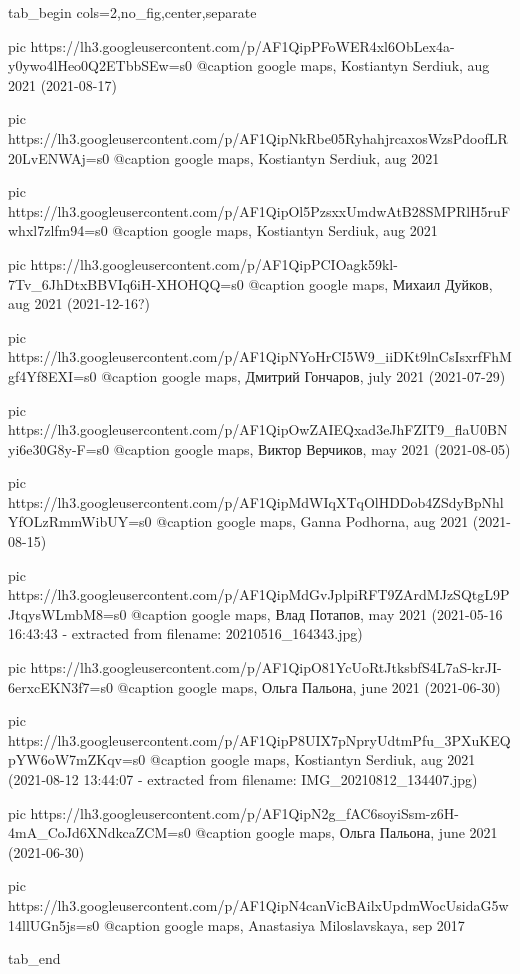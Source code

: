  
 
 
 
 

\ifcmt
  tab_begin cols=2,no_fig,center,separate

     pic https://lh3.googleusercontent.com/p/AF1QipPFoWER4xl6ObLex4a-y0ywo4lHeo0Q2ETbbSEw=s0
		 @caption google maps, Kostiantyn Serdiuk, aug 2021 (2021-08-17)

		 pic https://lh3.googleusercontent.com/p/AF1QipNkRbe05RyhahjrcaxosWzsPdoofLR20LvENWAj=s0
		 @caption google maps, Kostiantyn Serdiuk, aug 2021

		 pic https://lh3.googleusercontent.com/p/AF1QipOl5PzsxxUmdwAtB28SMPRlH5ruFwhxl7zlfm94=s0
		 @caption google maps, Kostiantyn Serdiuk, aug 2021

		 pic https://lh3.googleusercontent.com/p/AF1QipPCIOagk59kl-7Tv_6JhDtxBBVIq6iH-XHOHQQ=s0
		 @caption google maps, Михаил Дуйков, aug 2021 (2021-12-16?)

		 pic https://lh3.googleusercontent.com/p/AF1QipNYoHrCI5W9_iiDKt9lnCsIsxrfFhMgf4Yf8EXI=s0
		 @caption google maps, Дмитрий Гончаров, july 2021 (2021-07-29)

		 pic https://lh3.googleusercontent.com/p/AF1QipOwZAIEQxad3eJhFZIT9_flaU0BNyi6e30G8y-F=s0
		 @caption google maps, Виктор Верчиков, may 2021 (2021-08-05)

		 pic https://lh3.googleusercontent.com/p/AF1QipMdWIqXTqOlHDDob4ZSdyBpNhlYfOLzRmmWibUY=s0
		 @caption google maps, Ganna Podhorna, aug 2021 (2021-08-15)

		 pic https://lh3.googleusercontent.com/p/AF1QipMdGvJplpiRFT9ZArdMJzSQtgL9PJtqysWLmbM8=s0
		 @caption google maps, Влад Потапов, may 2021 (2021-05-16 16:43:43 - extracted from filename: 20210516_164343.jpg)

		 pic https://lh3.googleusercontent.com/p/AF1QipO81YcUoRtJtksbfS4L7aS-krJI-6erxcEKN3f7=s0
		 @caption google maps, Ольга Пальона, june 2021 (2021-06-30)

		 pic https://lh3.googleusercontent.com/p/AF1QipP8UIX7pNpryUdtmPfu_3PXuKEQpYW6oW7mZKqv=s0
		 @caption google maps, Kostiantyn Serdiuk, aug 2021 (2021-08-12 13:44:07 - extracted from filename: IMG_20210812_134407.jpg)

		 pic https://lh3.googleusercontent.com/p/AF1QipN2g_fAC6soyiSsm-z6H-4mA_CoJd6XNdkcaZCM=s0
		 @caption google maps, Ольга Пальона, june 2021 (2021-06-30)

		 pic https://lh3.googleusercontent.com/p/AF1QipN4canVicBAilxUpdmWocUsidaG5w14llUGn5js=s0
		 @caption google maps, Anastasiya Miloslavskaya, sep 2017

  tab_end
\fi

